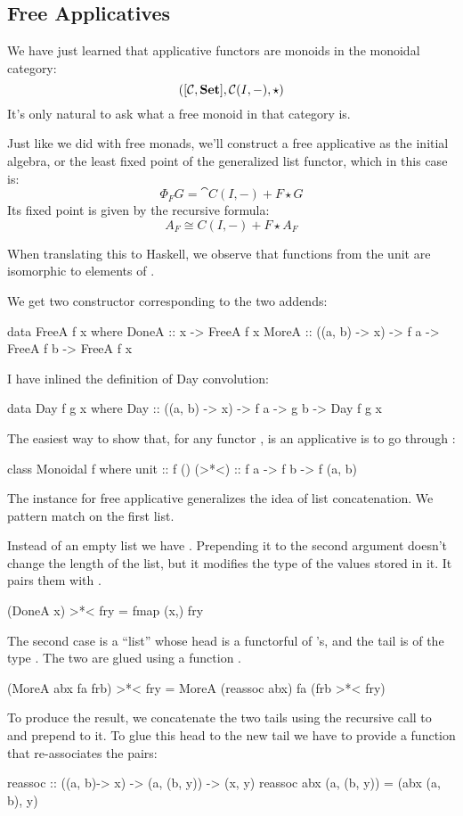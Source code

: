 \documentclass[DaoFP]{subfiles}
\begin{document}
\subsection{Free Applicatives}

We have just learned that applicative functors are monoids in the monoidal category:
\[ ([\mathcal{C}, \mathbf{Set}], \mathcal{C}(I, -), \star) \]
It's only natural to ask what a free monoid in that category is. 

Just like we did with free monads, we'll construct a free applicative as the initial algebra, or the least fixed point of the generalized list functor, which in this case is:
\[ \Phi_F G = \cat C(I, -) + F \star G \]
Its fixed point is given by the recursive formula:
\[ A_F \cong C(I, -) + F \star A_F\]

When translating this to Haskell, we observe that functions from the unit  are isomorphic to elements of . 

We get two constructor corresponding to the two addends:
\begin{haskell}
data FreeA f x where
  DoneA :: x -> FreeA f x
  MoreA :: ((a, b) -> x) -> f a -> FreeA f b -> FreeA f x
\end{haskell}
I have inlined the definition of Day convolution:
\begin{haskell}
data Day f g x where
  Day :: ((a, b) -> x) -> f a -> g b -> Day f g x
\end{haskell}

The easiest way to show that, for any functor ,  is an applicative is to go through :
\begin{haskell}
class Monoidal f where
  unit  :: f ()
  (>*<) :: f a -> f b -> f (a, b)
\end{haskell}

The  instance for free applicative generalizes the idea of list concatenation. We pattern match on the first list. 

Instead of an empty list we have . Prepending it to the second argument doesn't change the length of the list, but it modifies the type of the values stored in it. It pairs them with .
\begin{haskell}
  (DoneA x) >*< fry = fmap (x,) fry
\end{haskell}

The second case is a ``list'' whose head  is a functorful of 's, and the tail  is of the type . The two are glued using a function . 
\begin{haskell}
  (MoreA abx fa frb) >*< fry = MoreA (reassoc abx) fa (frb >*< fry)
\end{haskell}
To produce the result, we concatenate the two tails using the recursive call to \hask{>*<} and prepend  to it. To glue this head to the new tail we have to provide a function that re-associates the pairs:
\begin{haskell}
reassoc :: ((a, b)-> x) -> (a, (b, y)) -> (x, y)
reassoc abx (a, (b, y)) = (abx (a, b), y)
\end{haskell}
\end{document}

